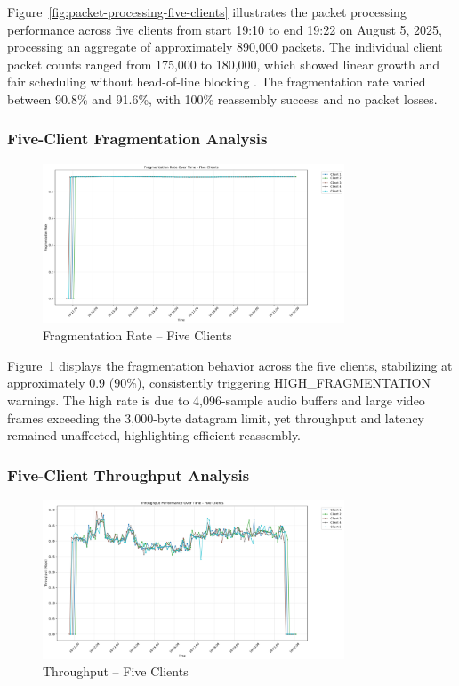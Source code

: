 Figure~\ref{fig:packet-processing-five-clients} illustrates the packet processing performance across five clients from start 19:10 to end 19:22 on August 5, 2025, processing an aggregate of approximately 890,000 packets. The individual client packet counts ranged from 175,000 to 180,000, which showed linear growth and fair scheduling without head-of-line blocking \cite{rfc9000}. The fragmentation rate varied between 90.8\% and 91.6\%, with 100\% reassembly success and no packet losses.

\subsubsection{Five-Client Fragmentation Analysis}

\begin{figure}[H]
\centering
\includegraphics[width=0.8\textwidth]{Evaluation/fragmentation_by_client_five-clients.png}
\caption{Fragmentation Rate – Five Clients}
\label{fig:fragmentation-five-clients}
\end{figure}

Figure~\ref{fig:fragmentation-five-clients} displays the fragmentation behavior across the five clients, stabilizing at approximately 0.9 (90\%), consistently triggering HIGH\_FRAGMENTATION warnings. The high rate is due to 4,096-sample audio buffers and large video frames exceeding the 3,000-byte datagram limit, yet throughput and latency remained unaffected, highlighting efficient reassembly.

\subsubsection{Five-Client Throughput Analysis}

\begin{figure}[H]
\centering
\includegraphics[width=0.8\textwidth]{Evaluation/throughput_by_client_five-clients.png}
\caption{Throughput – Five Clients}
\label{fig:throughput-five-clients}
\end{figure}

